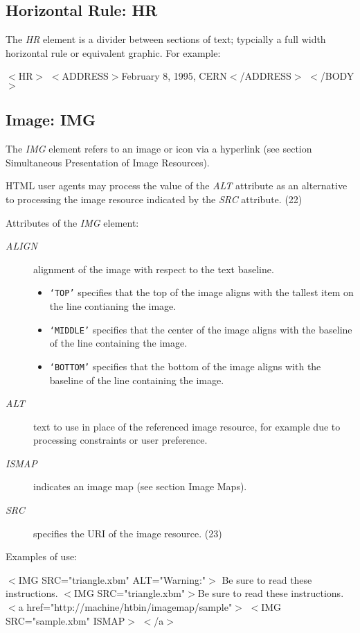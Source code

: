 \subsection*{Horizontal Rule:  HR}\par 
The {\it HR} element is a divider between sections of text;
typcially a full width horizontal rule or equivalent graphic.  For
example:
\par $<$HR$>$
$<$ADDRESS$>$February 8, 1995, CERN$<$/ADDRESS$>$
$<$/BODY$>$
\subsection*{Image:  IMG}\par 
The {\it IMG} element refers to an image or icon via a hyperlink
(see section Simultaneous Presentation of Image Resources).
\par \par 
HTML user agents may process the value of the {\it ALT} attribute
as an alternative to processing the image resource indicated by the
{\it SRC} attribute.
(22)\par \par 
Attributes of the {\it IMG} element:
\par \begin{description}\item[{\it ALIGN}]
alignment of the image with respect to the text
baseline.
\begin{itemize}\item {\tt `TOP'} specifies that the top of the image aligns with the
tallest item on the line contianing the image.
\item {\tt `MIDDLE'} specifies that the center of the image aligns with
the baseline of the line containing the image.
\item {\tt `BOTTOM'} specifies that the bottom of the image aligns with
the baseline of the line containing the image.
\end{itemize}\item[{\it ALT}]
text to use in place of the referenced image resource, for
example due to processing constraints or user preference.
\item[{\it ISMAP}]
indicates an image map (see section Image Maps).
\item[{\it SRC}]
specifies the URI of the image resource.
(23)\end{description}\par 
Examples of use:
\par $<$IMG SRC="triangle.xbm" ALT="Warning:"$>$ Be sure 
to read these instructions.
$<$IMG SRC="triangle.xbm"$>$Be sure to read these 
instructions.
$<$a href="http://machine/htbin/imagemap/sample"$>$
$<$IMG SRC="sample.xbm" ISMAP$>$
$<$/a$>$
